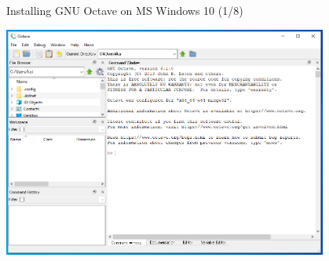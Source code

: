 \begin{frame}{Installing GNU Octave on MS Windows 10 (1/8)}
\begin{center}
\includegraphics[width=0.8\textwidth]{res/ms_windows/win_octave_gui.png}
\end{center}
\end{frame}



